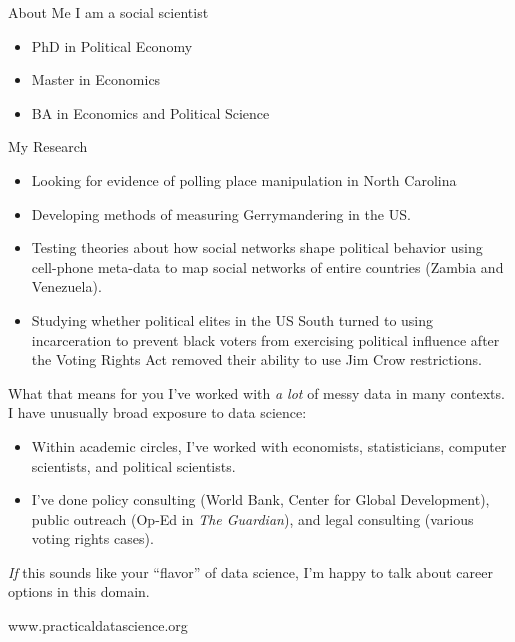 \documentclass[11pt]{beamer}
\begin{document}
\begin{frame}[c]{About Me}
	I am a social scientist \\
	\vspace{0.5cm}
	\begin{itemize}
		\pause \item PhD in Political Economy
		\pause \item Master in Economics
		\pause \item BA in Economics and Political Science
	\end{itemize}
\end{frame}

\begin{frame}[c]{My Research}
	\begin{itemize}
		\pause \item Looking for evidence of polling place manipulation in North Carolina
		\pause \item Developing methods of measuring Gerrymandering in the US.
		\pause \item Testing theories about how social networks shape political behavior using cell-phone meta-data to map social networks of entire countries (Zambia and Venezuela).
		\pause \item Studying whether political elites in the US South turned to using incarceration to prevent black voters from exercising political influence after the Voting Rights Act removed their ability to use Jim Crow restrictions.
	\end{itemize}
\end{frame}

\begin{frame}[c]{What that means for you}
\pause I've worked with \emph{a lot} of messy data in many contexts. \\
\pause I have unusually broad exposure to data science:
\begin{itemize}
	\pause \item Within academic circles, I've worked with economists, statisticians, computer scientists, and political scientists.
	\pause \item I've done \alert{policy consulting} (World Bank, Center for Global Development), \alert{public outreach} (Op-Ed in \emph{The Guardian}), and \alert{legal consulting} (various voting rights cases).
\end{itemize}
\pause \emph{If} this sounds like your ``flavor'' of data science, I'm happy to talk about career options in this domain.
\end{frame}

\begin{frame}[c]{}
	\begin{center}
www.practicaldatascience.org
	\end{center}
\end{frame}
\end{document}
